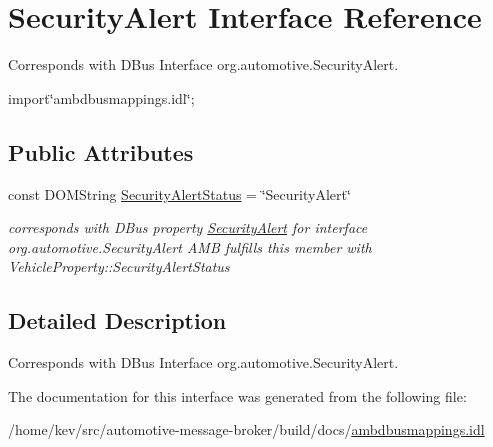 \hypertarget{interfaceSecurityAlert}{\section{Security\+Alert Interface Reference}
\label{interfaceSecurityAlert}
}


Corresponds with D\+Bus Interface org.\+automotive.\+Security\+Alert.  




{\ttfamily import\char`\"{}ambdbusmappings.\+idl\char`\"{};}

\subsection*{Public Attributes}
\begin{DoxyCompactItemize}
\item 
\hypertarget{interfaceSecurityAlert_ab0779cd468893792f8a69126dc27013d}{const D\+O\+M\+String \hyperlink{interfaceSecurityAlert_ab0779cd468893792f8a69126dc27013d}{Security\+Alert\+Status} = \char`\"{}Security\+Alert\char`\"{}}\label{interfaceSecurityAlert_ab0779cd468893792f8a69126dc27013d}

\begin{DoxyCompactList}\small\item\em corresponds with D\+Bus property \hyperlink{interfaceSecurityAlert}{Security\+Alert} for interface org.\+automotive.\+Security\+Alert A\+M\+B fulfills this member with Vehicle\+Property\+::\+Security\+Alert\+Status \end{DoxyCompactList}\end{DoxyCompactItemize}


\subsection{Detailed Description}
Corresponds with D\+Bus Interface org.\+automotive.\+Security\+Alert. 

The documentation for this interface was generated from the following file\+:\begin{DoxyCompactItemize}
\item 
/home/kev/src/automotive-\/message-\/broker/build/docs/\hyperlink{ambdbusmappings_8idl}{ambdbusmappings.\+idl}\end{DoxyCompactItemize}
